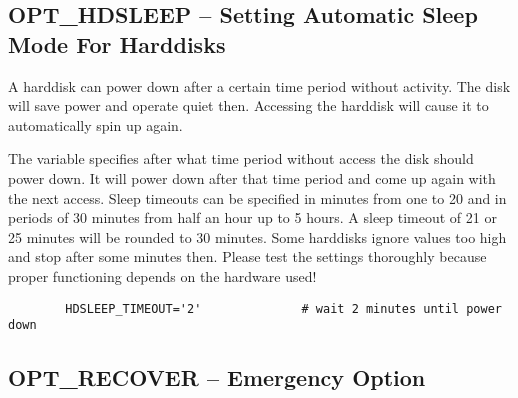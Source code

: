

\subsection {OPT\_HDSLEEP -- Setting Automatic Sleep Mode For Harddisks}

    A harddisk can power down after a certain time period without activity. 
    The disk will save power and operate quiet then. Accessing the harddisk 
    will cause it to automatically spin up again.


\begin{description}

        The variable specifies after what time period without access the disk should 
        power down. It will power down after that time period and come up again 
        with the next access. Sleep timeouts can be specified in minutes from one to 20 
        and in periods of 30 minutes from half an hour up to 5 hours. A sleep timeout 
        of 21 or 25 minutes will be rounded to 30 minutes.
        Some harddisks ignore values too high and stop after some minutes then. 
        Please test the settings thoroughly because proper functioning depends
        on the hardware used!

\begin{example}
\begin{verbatim}
        HDSLEEP_TIMEOUT='2'              # wait 2 minutes until power down
\end{verbatim}
\end{example}

\end{description}

\subsection {OPT\_RECOVER -- Emergency Option}

